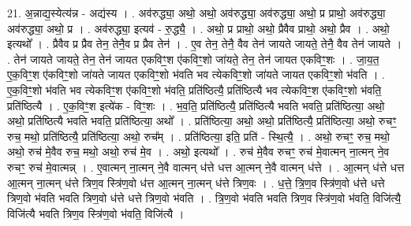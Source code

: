 \documentclass[17pt]{extarticle}
\begin{document}
21. अ॒न्नाद्य॒स्येत्य॑न्न - अद्य॑स्य । . अव॑रुद्ध्या॒ अथो॒ अथो॒ अव॑रुद्ध्या॒ अव॑रुद्ध्या॒ अथो॒ प्र प्राथो॒ अव॑रुद्ध्या॒ अव॑रुद्ध्या॒ अथो॒ प्र । . अव॑रुद्ध्या॒ इत्यव॑ - रु॒द्ध्यै॒ । . अथो॒ प्र प्राथो॒ अथो॒ प्रैवैव प्राथो॒ अथो॒ प्रैव । . अथो॒ इत्यथो᳚ । . प्रैवैव प्र प्रैव तेन॒ तेनै॒व प्र प्रैव तेन॑ । . ए॒व तेन॒ तेनै॒ वैव तेन॑ जायते जायते॒ तेनै॒ वैव तेन॑ जायते । . तेन॑ जायते जायते॒ तेन॒ तेन॑ जायत एकविꣳ॒॒श ए॑कविꣳ॒॒शो जा॑यते॒ तेन॒ तेन॑ जायत एकविꣳ॒॒शः । . जा॒य॒त॒ ए॒क॒विꣳ॒॒श ए॑कविꣳ॒॒शो जा॑यते जायत एकविꣳ॒॒शो भ॑वति भव त्येकविꣳ॒॒शो जा॑यते जायत एकविꣳ॒॒शो भ॑वति । . ए॒क॒विꣳ॒॒शो भ॑वति भव त्येकविꣳ॒॒श ए॑कविꣳ॒॒शो भ॑वति॒ प्रति॑ष्ठित्यै॒ प्रति॑ष्ठित्यै भव त्येकविꣳ॒॒श ए॑कविꣳ॒॒शो भ॑वति॒ प्रति॑ष्ठित्यै । . ए॒क॒विꣳ॒॒श इत्ये॑क - विꣳ॒॒शः । . भ॒व॒ति॒ प्रति॑ष्ठित्यै॒ प्रति॑ष्ठित्यै भवति भवति॒ प्रति॑ष्ठित्या॒ अथो॒ अथो॒ प्रति॑ष्ठित्यै भवति भवति॒ प्रति॑ष्ठित्या॒ अथो᳚ । . प्रति॑ष्ठित्या॒ अथो॒ अथो॒ प्रति॑ष्ठित्यै॒ प्रति॑ष्ठित्या॒ अथो॒ रुचꣳ॒॒ रुच॒ मथो॒ प्रति॑ष्ठित्यै॒ प्रति॑ष्ठित्या॒ अथो॒ रुच᳚म् । . प्रति॑ष्ठित्या॒ इति॒ प्रति॑ - स्थि॒त्यै॒ । . अथो॒ रुचꣳ॒॒ रुच॒ मथो॒ अथो॒ रुच॑ मे॒वैव रुच॒ मथो॒ अथो॒ रुच॑ मे॒व । . अथो॒ इत्यथो᳚ । . रुच॑ मे॒वैव रुचꣳ॒॒ रुच॑ मे॒वात्मन् ना॒त्मन् ने॒व रुचꣳ॒॒ रुच॑ मे॒वात्मन्न् । . ए॒वात्मन् ना॒त्मन् ने॒वै वात्मन् ध॑त्ते धत्त आ॒त्मन् ने॒वै वात्मन् ध॑त्ते । . आ॒त्मन् ध॑त्ते धत्त आ॒त्मन् ना॒त्मन् ध॑त्ते त्रिण॒व स्त्रि॑ण॒वो ध॑त्त आ॒त्मन् ना॒त्मन् ध॑त्ते त्रिण॒वः । . ध॒त्ते॒ त्रि॒ण॒व स्त्रि॑ण॒वो ध॑त्ते धत्ते त्रिण॒वो भ॑वति भवति त्रिण॒वो ध॑त्ते धत्ते त्रिण॒वो भ॑वति । . त्रि॒ण॒वो भ॑वति भवति त्रिण॒व स्त्रि॑ण॒वो भ॑वति॒ विजि॑त्यै॒ विजि॑त्यै भवति त्रिण॒व स्त्रि॑ण॒वो भ॑वति॒ विजि॑त्यै । \newline
\end{document}
